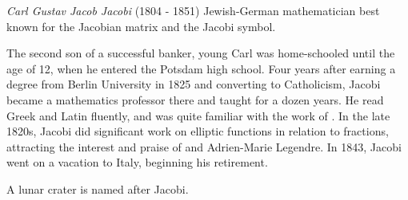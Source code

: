 \documentclass[12pt]{article}
\begin{document}
\emph{Carl Gustav Jacob Jacobi} (1804 - 1851) Jewish-German mathematician best known for the Jacobian matrix and the Jacobi symbol.

The second son of a successful banker, young Carl was home-schooled until the age of 12, when he entered the Potsdam high school. Four years after earning a degree from Berlin University in 1825 and converting to Catholicism, Jacobi became a mathematics professor there and taught for a dozen years. He read Greek and Latin fluently, and was quite familiar with the work of . In the late 1820s, Jacobi did significant work on elliptic functions in relation to fractions, attracting the interest and praise of  and Adrien-Marie Legendre. In 1843, Jacobi went on a vacation to Italy, beginning his retirement.

A lunar crater is named after Jacobi.
\end{document}
